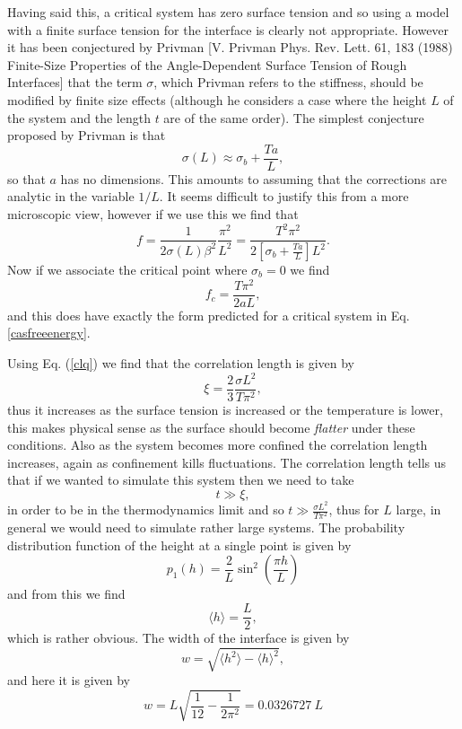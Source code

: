 Having said this, a critical system has zero surface tension and so using a model with a finite surface tension for the interface is clearly not appropriate. However it has been conjectured by Privman \cite{privman} [V. Privman Phys. Rev. Lett. 61, 183  (1988) Finite-Size Properties of the Angle-Dependent Surface Tension of Rough Interfaces] that the term $\sigma$, which Privman refers to the stiffness, should be modified by finite size effects (although he considers a case where the height $L$ of the system and the length $t$ are of the same order). The simplest conjecture proposed by Privman \cite{privman} is that
\begin{equation}
\sigma(L)\approx \sigma_b + \frac{T a}{L},
\end{equation}
so that $a$ has no dimensions.
This amounts to  assuming that the corrections are analytic in the variable $1/L$. It seems difficult to justify this from a more microscopic view, however if we use this we find that
\begin{equation}
f = \frac{1}{2\sigma(L)\beta^2}\frac{\pi^2}{L^2}= \frac{T^2\pi^2}{2[ \sigma_b + \frac{T a}{L}]L^2}.
\end{equation}
Now if we associate the critical point where $\sigma_b=0$ we find
\begin{equation}
f_c= \frac{T\pi^2}{2 a L},
\end{equation}
and this does have exactly the form predicted for a critical system in Eq. \eqref{casfreeenergy}.

Using Eq. (\ref{clq}) we find that  the correlation length is given by
\begin{equation}
\xi = \frac{2}{3}\frac{\sigma L^2}{T\pi^2},\label{corel}
\end{equation}
thus it increases as the surface tension is increased or the temperature is lower, this makes physical sense as the surface should become {\em flatter} under these conditions. Also as the system becomes more confined the correlation length increases, again as  confinement  
kills fluctuations. The correlation length tells us that if we wanted to simulate this system then we need to take
\begin{equation}
t\gg \xi ,
\end{equation}
in order to be in the thermodynamics limit and so $t \gg \frac{\sigma L^2}{T\pi^2}$, thus for 
$L$ large, in general we would need to simulate rather large systems.
The probability distribution function of the height at a single point is given by
\begin{equation}
p_1(h) =\frac{2}{L}\sin^2(\frac{\pi h}{L})
\end{equation}
and from this we find 
\begin{equation}
\langle h\rangle = \frac{L}{2},  
\end{equation}
which is rather obvious. The width of the interface is given by 
\begin{equation}
w=\sqrt{\langle h^2\rangle - \langle h\rangle^2},
\end{equation}
and here it is given by
\begin{equation}
w= L\sqrt{\frac{1}{12}-\frac{1}{2\pi^2}}= 0.0326727\  L
\end{equation}

